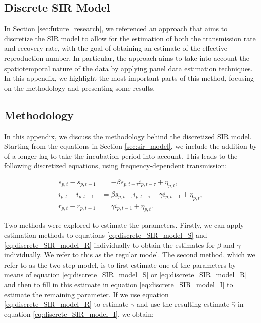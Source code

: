 \documentclass[12pt]{article}
\begin{document}
\begin{appendices}
		\newpage
		\section{Discrete SIR Model} \label{app:discrete_SIR}
		In Section \ref{sec:future_research}, we referenced an approach that aims to discretize the SIR model to allow for the estimation of both the transmission rate and recovery rate, with the goal of obtaining an estimate of the effective reproduction number. In particular, the approach aims to take into account the spatiotemporal nature of the data by applying panel data estimation techniques. In this appendix, we highlight the most important parts of this method, focusing on the methodology and presenting some results.
		
		\subsection{Methodology} \label{sapp:discrete_SIR_methodology}
		In this appendix, we discuss the methodology behind the discretized SIR model. Starting from the equations in Section \ref{sec:sir_model}, we include the addition by \textcite{adda2016economic} of a longer lag to take the incubation period into account. This leads to the following discretized equations, using frequency-dependent transmission:
		
		\begin{align}
        	s_{p,t} - s_{p,t-1} &= -\beta s_{p,t-\tau}i_{p,t-\tau} + \eta_{p,t}, \label{eq:discrete_SIR_model_S}\\
        	i_{p,t} - i_{p,t-1} &= \beta s_{p,t-\tau}i_{p,t-\tau} - \gamma i_{p,t-1} + \eta_{p,t}, \label{eq:discrete_SIR_model_I}\\
        	r_{p,t} - r_{p,t-1} &= \gamma i_{p,t-1} + \eta_{p,t}. \label{eq:discrete_SIR_model_R}
    	\end{align}
	
    	Two methods were explored to estimate the parameters. Firstly, we can apply estimation methods to equations \eqref{eq:discrete_SIR_model_S} and \eqref{eq:discrete_SIR_model_R} individually to obtain the estimates for $\beta$ and $\gamma$ individually. We refer to this as the regular model. The second method, which we refer to as the two-step model, is to first estimate one of the parameters by means of equation \eqref{eq:discrete_SIR_model_S} or \eqref{eq:discrete_SIR_model_R} and then to fill in this estimate in equation \eqref{eq:discrete_SIR_model_I} to estimate the remaining parameter. If we use equation \eqref{eq:discrete_SIR_model_R} to estimate $\gamma$ and use the resulting estimate $\hat{\gamma}$ in equation \eqref{eq:discrete_SIR_model_I}, we obtain:
    	    

\end{appendices}
\end{document}
